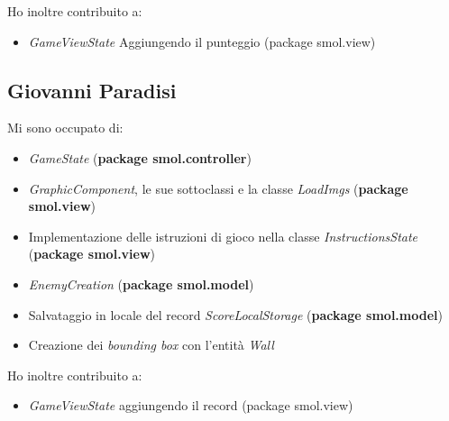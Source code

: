 \documentclass[a4paper,12pt]{report}
\begin{document}
Ho inoltre contribuito a:
\begin{itemize}
    \item \emph{GameViewState} Aggiungendo il punteggio (package smol.view)
\end{itemize}

\subsection*{Giovanni Paradisi}

Mi sono occupato di:
\begin{itemize}
    \item \emph{GameState} (\textbf{package smol.controller})
    \item \emph{GraphicComponent}, le sue sottoclassi e la classe \emph{LoadImgs} (\textbf{package smol.view})
    \item Implementazione delle istruzioni di gioco nella classe \emph{InstructionsState} (\textbf{package smol.view})
    \item \emph{EnemyCreation} (\textbf{package smol.model})
    \item Salvataggio in locale del record \emph{ScoreLocalStorage} (\textbf{package smol.model})
    \item Creazione dei \emph{bounding box} con l'entità \emph{Wall}
\end{itemize}

Ho inoltre contribuito a:
\begin{itemize}
    \item \emph{GameViewState} aggiungendo il record (package smol.view)
\end{itemize}
\end{document}
